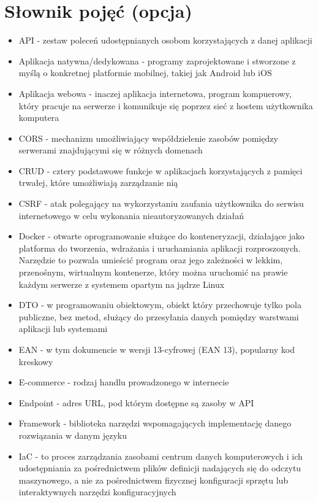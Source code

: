 \documentclass[../main.tex]{subfiles}
\begin{document}
    \section{Słownik pojęć (opcja)}
    \begin{itemize}
        \item API - zestaw poleceń udostępnianych osobom korzystających z danej aplikacji
        \item Aplikacja natywna/dedykowana - programy zaprojektowane i stworzone z myślą o konkretnej platformie mobilnej, takiej jak Android lub iOS
        \item Aplikacja webowa - inaczej aplikacja internetowa, program kompuerowy, który pracuje na serwerze i komunikuje się poprzez sieć z hostem użytkownika komputera
        \item CORS - mechanizm umożliwiający współdzielenie zasobów pomiędzy serwerami znajdującymi się w różnych domenach
        \item CRUD - cztery podstawowe funkcje w aplikacjach korzystających z pamięci trwałej, które umożliwiają zarządzanie nią
        \item CSRF - atak polegający na wykorzystaniu zaufania użytkownika do serwisu internetowego w celu wykonania nieautoryzowanych działań
        \item Docker - otwarte oprogramowanie służące do konteneryzacji, działające jako platforma do tworzenia, wdrażania i uruchamiania aplikacji rozproszonych.
        Narzędzie to pozwala umieścić program oraz jego zależności w lekkim, przenośnym, wirtualnym kontenerze, który można uruchomić na prawie każdym serwerze z systemem opartym na jądrze Linux
        \item DTO - w programowaniu obiektowym, obiekt który przechowuje tylko pola publiczne, bez metod, służący do przesyłania danych pomiędzy warstwami aplikacji lub systemami
        \item EAN - w tym dokumencie w wersji 13-cyfrowej (EAN 13), popularny kod kreskowy
        \item E-commerce - rodzaj handlu prowadzonego w internecie
        \item Endpoint - adres URL, pod którym dostępne są zasoby w API
        \item Framework - biblioteka narzędzi wspomagających implementację danego rozwiązania w danym języku
        \item IaC - to proces zarządzania zasobami centrum danych komputerowych i ich udostępniania za pośrednictwem plików definicji nadających się do odczytu maszynowego, a nie za pośrednictwem fizycznej konfiguracji sprzętu lub interaktywnych narzędzi konfiguracyjnych

\end{itemize}
\end{document}
